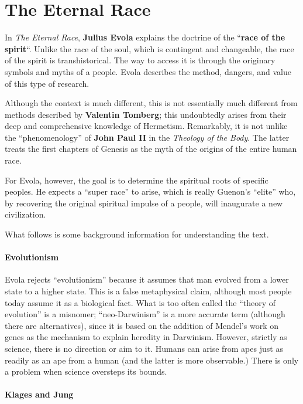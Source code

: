 \section{The Eternal Race}

In \emph{The Eternal Race}, \textbf{Julius Evola} explains the doctrine of the ``\textbf{race of the spirit}``. Unlike the race of the soul, which is contingent and changeable, the race of the spirit is transhistorical. The way to access it is through the originary symbols and myths of a people. Evola describes the method, dangers, and value of this type of research.

Although the context is much different, this is not essentially much different from methods described by \textbf{Valentin Tomberg}; this undoubtedly arises from their deep and comprehensive knowledge of Hermetism. Remarkably, it is not unlike the ``phenomenology'' of \textbf{John Paul II} in the \emph{Theology of the Body}. The latter treats the first chapters of Genesis as the myth of the origins of the entire human race.

For Evola, however, the goal is to determine the spiritual roots of specific peoples. He expects a ``super race'' to arise, which is really Guenon's ``elite'' who, by recovering the original spiritual impulse of a people, will inaugurate a new civilization.

What follows is some background information for understanding the text.

\paragraph{Evolutionism}


Evola rejects ``evolutionism'' because it assumes that man evolved from a lower state to a higher state. This is a false metaphysical claim, although most people today assume it as a biological fact. What is too often called the ``theory of evolution'' is a misnomer; ``neo-Darwinism'' is a more accurate term (although there are alternatives), since it is based on the addition of Mendel's work on genes as the mechanism to explain heredity in Darwinism. However, strictly as science, there is no direction or aim to it. Humans can arise from apes just as readily as an ape from a human (and the latter is more observable.) There is only a problem when science oversteps its bounds.

\paragraph{Klages and Jung}


